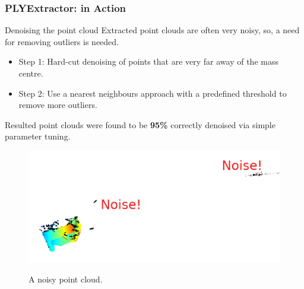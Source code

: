 \documentclass{beamer}
\begin{document}
\begin{frame}\frametitle{PLYExtractor: in Action}

\begin{figure}
\hfill
{}
\hfill
{}
\hfill
\end{figure}


\end{frame}




\begin{frame}{Denoising the point cloud}
Extracted point clouds are often very noisy, so, a need for removing outliers is needed.

\begin{itemize}
	\item Step 1: Hard-cut denoising of points that are very far away of the mass centre.
	\item Step 2: Use a nearest neighbours approach with a predefined threshold to remove more outliers. 
\end{itemize}

Resulted point clouds were found to be \textbf{95\%} correctly denoised via simple parameter tuning.
\begin{figure}
	\includegraphics[width=0.6\linewidth]{Figures/noisy}
	\label{noisy}
	\caption{A noisy point cloud.}
\end{figure} 


\end{frame}
\end{document}
